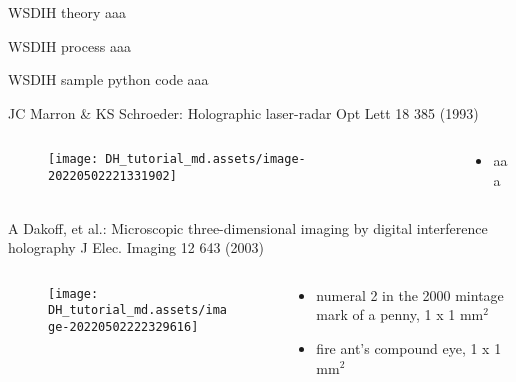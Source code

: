 \documentclass[t, aspectratio=169]{beamer}
\begin{document}
\begin{frame}{WSDIH theory}
aaa
\end{frame}


\begin{frame}{WSDIH process}
aaa
\end{frame}


\begin{frame}{WSDIH sample python code}
aaa
\end{frame}


\begin{frame}{JC Marron \& KS Schroeder: Holographic laser-radar}
	\vspace{-3 mm}
	\small Opt Lett 18 385 (1993)
	\begin{columns}
		\begin{column}{.6\textwidth}
			\begin{figure}
				\texttt{[image: DH\_tutorial\_md.assets/image-20220502221331902]}
			\end{figure}
		\end{column}
		\begin{column}{.4\textwidth}
			\begin{itemize}
				\item aaa
			\end{itemize}
		\end{column}
	\end{columns}
\end{frame}


\begin{frame}{A Dakoff, et al.: Microscopic three-dimensional imaging by digital interference holography}
	\vspace{-3 mm}
	\small J Elec. Imaging 12 643 (2003)
	\begin{columns}
		\begin{column}{.6\textwidth}
			\begin{figure}
				\texttt{[image: DH\_tutorial\_md.assets/image-20220502222329616]}
			\end{figure}
		\end{column}
		\begin{column}{.4\textwidth}
			\begin{itemize}
				\item[a) ] numeral 2 in the 2000 mintage mark of a penny, 1 x 1 mm$^2$
				\item[b) ] fire ant's compound eye, 1 x 1 mm$^2$
			\end{itemize}
		\end{column}
	\end{columns}
\end{frame}
\end{document}
